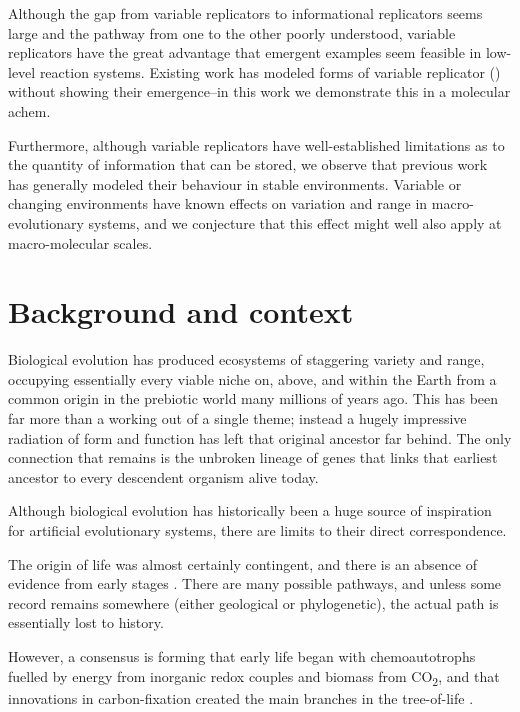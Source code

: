 Although the gap from variable replicators to informational replicators seems large and the pathway from one to the other poorly understood, variable replicators have the great advantage that emergent examples seem feasible in low-level reaction systems. Existing work has modeled forms of variable replicator (\eg \cite{Vasas2012}) without showing their emergence--in this work we demonstrate this in a molecular \gls{achem}.

Furthermore, although variable replicators have well-established limitations as to the quantity of information that can be stored, we observe that previous work has generally modeled their behaviour in stable environments. Variable or changing environments have known effects on variation and range in macro-evolutionary systems, and we conjecture that this effect might well also apply at macro-molecular scales.

\section{Background and context}\label{background-and-context}

Biological evolution has produced ecosystems of staggering variety and range, occupying essentially every viable niche on, above, and within the Earth from a common origin in the prebiotic world many millions of years ago. This has been far more than a working out of a single theme; instead a hugely impressive radiation of form and function has left that original ancestor far behind. The only connection that remains is the unbroken lineage of genes that links that earliest ancestor to every descendent organism alive today.

Although biological evolution has historically been a huge source of inspiration for artificial evolutionary systems, there are limits to their direct correspondence. 

The origin of life was almost certainly contingent, and there is an absence of evidence from early stages \parencite{Pross2013}. There are many possible pathways, and unless some record remains somewhere (either geological or phylogenetic), the actual path is essentially lost to history.

However, a consensus is forming that early life began with chemoautotrophs fuelled by energy from inorganic redox couples and biomass from CO\textsubscript{2}, and that innovations in carbon-fixation created the main branches in the tree-of-life \parencite{Braakman2012}. 

